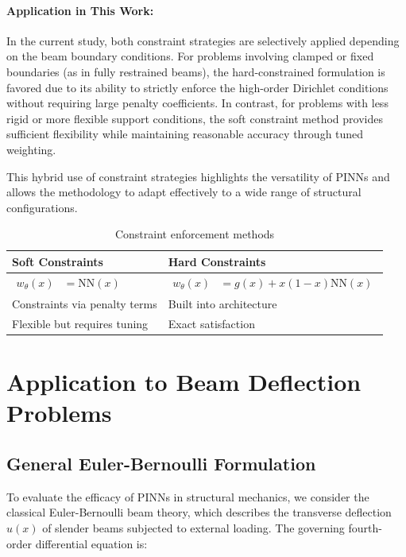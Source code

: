 \documentclass[twocolumn]{svjour3}
\begin{document}
	\paragraph{Application in This Work:} 
	In the current study, both constraint strategies are selectively applied depending on the beam boundary conditions. For problems involving clamped or fixed boundaries (as in fully restrained beams), the hard-constrained formulation is favored due to its ability to strictly enforce the high-order Dirichlet conditions without requiring large penalty coefficients. In contrast, for problems with less rigid or more flexible support conditions, the soft constraint method provides sufficient flexibility while maintaining reasonable accuracy through tuned weighting.
	
	This hybrid use of constraint strategies highlights the versatility of PINNs and allows the methodology to adapt effectively to a wide range of structural configurations.
	
	\begin{table}[htbp]
		\centering
		\caption{Constraint enforcement methods}
		\begin{tabular}{p{}p{}}
			\toprule
			\textbf{Soft Constraints} & \textbf{Hard Constraints} \\
			\midrule
			$\begin{aligned}
				w_{\theta}(x) &= \text{NN}(x)
			\end{aligned}$ & $\begin{aligned}
				w_{\theta}(x) &= g(x) + x(1-x)\text{NN}(x)
			\end{aligned}$ \\
			Constraints via penalty terms & Built into architecture \\
			Flexible but requires tuning & Exact satisfaction \\
			\bottomrule
		\end{tabular}\label{tab:constraints}
	\end{table}
	
	\section{Application to Beam Deflection Problems}\label{sec:implementation}
	\subsection{General Euler-Bernoulli Formulation}
	
	To evaluate the efficacy of PINNs in structural mechanics, we consider the classical Euler-Bernoulli beam theory, which describes the transverse deflection $u(x)$ of slender beams subjected to external loading. The governing fourth-order differential equation is:
	
\end{document}
